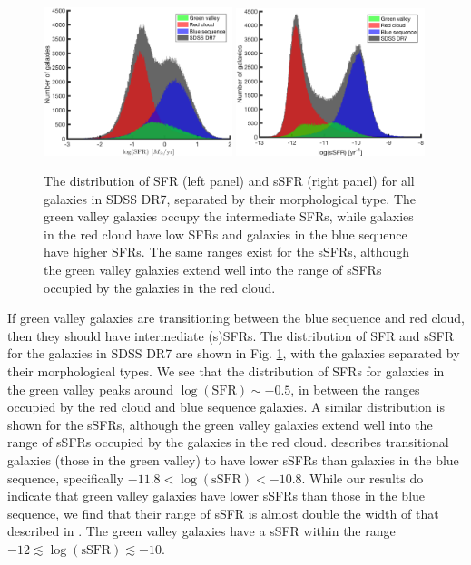 \begin{figure}
    \includegraphics[width=0.49\textwidth]{Images/GV/SFR_hist}
    \includegraphics[width=0.49\textwidth]{Images/GV/sSFR_hist}
    \caption[(s)SFR distribution by morphological type]{The distribution of SFR 
    (left panel) and sSFR (right panel) for all galaxies in SDSS DR7, separated 
    by their morphological type.  The green valley galaxies occupy the 
    intermediate SFRs, while galaxies in the red cloud have low SFRs and 
    galaxies in the blue sequence have higher SFRs.  The same ranges exist for 
    the sSFRs, although the green valley galaxies extend well into the range of 
    sSFRs occupied by the galaxies in the red cloud.}
    \label{fig:SFR_hist}
\end{figure}

If green valley galaxies are transitioning between the blue sequence and red 
cloud, then they should have intermediate (s)SFRs.  The distribution of SFR and 
sSFR for the galaxies in SDSS DR7 are shown in Fig. \ref{fig:SFR_hist}, with the 
galaxies separated by their morphological types.  We see that the distribution 
of SFRs for galaxies in the green valley peaks around 
$\log(\text{SFR}) \sim -0.5$, in between the ranges occupied by the red cloud 
and blue sequence galaxies.  A similar distribution is shown for the sSFRs, 
although the green valley galaxies extend well into the range of sSFRs occupied 
by the galaxies in the red cloud.  \cite{Salim14a} describes transitional 
galaxies (those in the green valley) to have lower sSFRs than galaxies in the 
blue sequence, specifically $-11.8 < \log(\text{sSFR}) < -10.8$.  While our 
results do indicate that green valley galaxies have lower sSFRs than those in 
the blue sequence, we find that their range of sSFR is almost double the width 
of that described in \cite{Salim14a}.  The green valley galaxies have a sSFR 
within the range $-12 \lesssim \log(\text{sSFR}) \lesssim -10$.


